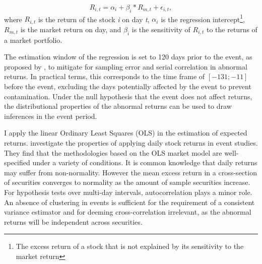 \begin{equation} 
    R_{i,t} = \alpha_i + \beta_i * R_{m,t} + \epsilon_{i,t},
    \label{eq:market_model}
\end{equation}
 where $R_{i,t}$ is the return of the stock \textit{i} on day \textit{t}, $\alpha_i$ is the regression intercept\footnote{The excess return of a stock that is not explained by its sensitivity to the market return}, $R_{m,t}$ is the market return on day, and
 $\beta_i$ is the sensitivity of $R_{i,t}$ to the returns of a market portfolio.
 
The estimation window of the regression is set to 120 days prior to the event, as proposed by \cite{Event_studies}, to mitigate for sampling error and serial correlation in abnormal returns. In practical terms, this corresponds to the time frame of $[-131;-11]$ before the event, excluding the days potentially affected by the event to prevent contamination. Under the null hypothesis that the event does not affect returns, the distributional properties of the abnormal returns can be used to draw inferences in the event period. 

I apply the linear Ordinary Least Squares (OLS) in the estimation of expected returns. \cite{brown1985using} investigate the properties of applying daily stock returns in event studies. They find that the methodologies based on the OLS market model are well-specified under a variety of conditions. It is common knowledge that daily returns may suffer from non-normality. However the mean excess return in a cross-section of securities converges to normality as the amount of sample securities increase. For hypothesis tests over multi-day intervals, autocorrelation plays a minor role. An absence of clustering in events is sufficient for the requirement of a consistent variance estimator and for deeming cross-correlation irrelevant, as the abnormal returns will be independent across securities. 

